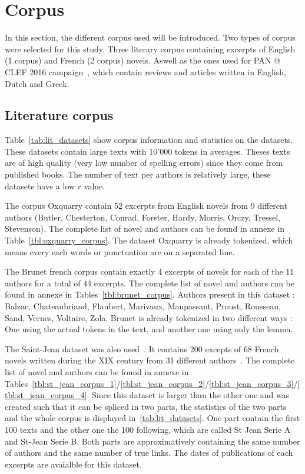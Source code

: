 \section{Corpus \label{sec:corpus}}

In this section, the different corpus used will be introduced.
Two types of corpus were selected for this study.
Three literary corpus containing excerpts of English (1 corpus) and French (2 corpus) novels.
Aswell as the ones used for PAN @ CLEF 2016 campaign~\cite{pan16}, which contain reviews and articles written in English, Dutch and Greek.

\subsection{Literature corpus}
\label{sec:lit_corpus}

Table~\ref{tab:lit_datasets} show corpus information and statistics on the datasets.
These datasets contain large texts with 10'000 tokens in averages.
Theses texts are of high quality (very low number of spelling errors) since they come from published books.
The number of text per authors is relatively large, these datasets have a low $r$ value.

The corpus Oxquarry contain 52 excerpts from English novels from 9 different authors (Butler, Chesterton, Conrad, Forster, Hardy, Morris, Orczy, Tressel, Stevenson).
The complete list of novel and authors can be found in annexe in Table~\ref{tbl:oxquarry_corpus}.
The dataset Oxquarry is already tokenized, which means every each words or punctuation are on a separated line.

The Brunet french corpus contain exactly 4 excerpts of novels for each of the 11 authors for a total of 44 excerpts.
The complete list of novel and authors can be found in annexe in Tables~\ref{tbl:brunet_corpus}.
Authors present in this dataset : Balzac, Chateaubriand, Flaubert, Marivaux, Maupassant, Proust, Rousseau, Sand, Vernes, Voltaire, Zola.
Brunet is already tokenized in two different ways : One using the actual tokens in the text, and another one using only the lemma.

The Saint-Jean dataset was also used~\cite{unine_corpus}.
It contains 200 excepts of 68 French novels written during the XIX century from 31 different authors~\cite{st_jean}.
The complete list of novel and authors can be found in annexe in Tables~\ref{tbl:st_jean_corpus_1}/\ref{tbl:st_jean_corpus_2}/\ref{tbl:st_jean_corpus_3}/\ref{tbl:st_jean_corpus_4}.
Since this dataset is larger than the other one and was created such that it can be spliced in two parts, the statistics of the two parts and the whole corpus is displayed in~\ref{tab:lit_datasets}.
One part contain the first 100 texts and the other one the 100 following, which are called St Jean Serie A and St-Jean Serie B.
Both parts are approximatively containing the same number of authors and the same number of true links.
The dates of publications of each excerpts are avaialble for this dataset.

